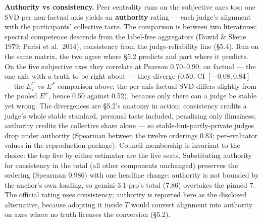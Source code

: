 \textbf{Authority vs consistency.} Peer centrality runs on the subjective axes too: one SVD per non-factual axis yields an \textbf{authority} rating --- each judge's alignment with the participants' collective taste. The comparison is between two literatures: spectral competence descends from the label-free aggregators (Dawid \& Skene 1979; Parisi et al.~2014), consistency from the judge-reliability line (§5.4). Run on the same matrix, the two agree where §5.2 predicts and part where it predicts. On the five subjective axes they correlate at Pearson \(0.70\)--\(0.90\); on factual --- the one axis with a truth to be right about --- they diverge (\(0.50\), CI \([-0.08, 0.84]\) --- the \(E^{C}_f\)-vs-\(E^{F}\) comparison above; the per-axis factual SVD differs slightly from the pooled \(E^{F}\), hence 0.50 against 0.52), because only there can a judge be stable yet wrong. The divergences are §5.2's anatomy in action: consistency credits a judge's whole stable standard, personal taste included, penalising only flimsiness; authority credits the collective share alone --- so stable-but-partly-private judges drop under authority (Spearman between the twelve orderings 0.83; per-evaluator values in the reproduction package). Council membership is invariant to the choice: the top five by either estimator are the five seats. Substituting authority for consistency in the total (all other components unchanged) preserves the ordering (Spearman \(0.986\)) with one headline change: authority is not bounded by the anchor's own loading, so gemini-3.1-pro's total (\(7.86\)) overtakes the pinned \(7\). The official rating uses consistency; authority is reported here as the disclosed alternative, because adopting it inside \(T\) would convert alignment into authority on axes where no truth licenses the conversion (§5.2).

